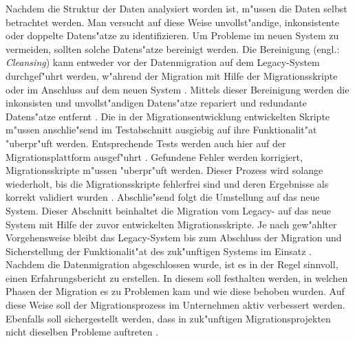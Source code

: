 \lb
Nachdem die Struktur der Daten analysiert worden ist, m"ussen die Daten selbst betrachtet werden. Man versucht auf diese Weise unvollst"andige, inkonsistente oder doppelte Datens"atze zu identifizieren. Um Probleme im neuen System zu vermeiden, sollten solche Datens"atze bereinigt werden. Die Bereinigung (engl.: \textit{ Cleansing}) kann entweder vor der Datenmigration auf dem Legacy-System durchgef"uhrt werden, w"ahrend der Migration mit Hilfe der Migrationsskripte oder im Anschluss auf dem neuen System \citep[S~7f.]{klausMatthesSchulz-2012}. Mittels dieser Bereinigung werden die inkonsisten und unvollst"andigen Datens"atze repariert und redundante Datens"atze entfernt \citep[S.~7f.]{rahm-2010}. 
\lb
Die in der Migrationsentwicklung entwickelten Skripte m"ussen anschlie"send im Testabschnitt ausgiebig auf ihre Funktionalit"at "uberpr"uft werden. Entsprechende Tests werden auch hier auf der Migrationsplattform ausgef"uhrt \citep[S.~8f.]{klausMatthesSchulz-2012}. Gefundene Fehler werden korrigiert, Migrationsskripte m"ussen "uberpr"uft werden. Dieser Prozess wird solange wiederholt, bis die Migrationsskripte fehlerfrei sind und deren Ergebnisse als korrekt validiert wurden \citep[S.~8f.]{klausMatthesSchulz-2012}.
\lb
Abschlie"send folgt die Umstellung auf das neue System. Dieser Abschnitt beinhaltet die Migration vom Legacy- auf das neue System mit Hilfe der zuvor entwickelten Migrationsskripte. Je nach gew"ahlter Vorgehensweise bleibt das Legacy-System bis zum Abschluss der Migration und Sicherstellung der Funktionalit"at des zuk"unftigen Systems im Einsatz \citep[S.~107]{bisbal-1999}. 
\lb
Nachdem die Datenmigration abgeschlossen wurde, ist es in der Regel sinnvoll, einen Erfahrungsbericht zu erstellen. In diesem soll festhalten werden, in welchen Phasen der Migration es zu Problemen kam und wie diese behoben wurden. Auf diese Weise soll der Migrationsprozess im Unternehmen aktiv verbessert werden. Ebenfalls soll sichergestellt werden, dass in zuk"unftigen Migrationsprojekten nicht dieselben Probleme auftreten \citep[S.~10]{klausMatthesSchulz-2012}.


